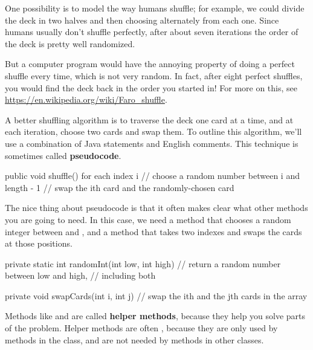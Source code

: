One possibility is to model the way humans shuffle; for example, we could divide the deck in two halves and then choosing alternately from each one.
Since humans usually don't shuffle perfectly, after about seven iterations the order of the deck is pretty well randomized.

But a computer program would have the annoying property of doing a perfect shuffle every time, which is not very random.
In fact, after eight perfect shuffles, you would find the deck back in the order you started in!
For more on this, see \url{https://en.wikipedia.org/wiki/Faro_shuffle}.


A better shuffling algorithm is to traverse the deck one card at a time, and at each iteration, choose two cards and swap them.
To outline this algorithm, we'll use a combination of Java statements and English comments.
This technique is sometimes called {\bf pseudocode}.


\begin{code}
public void shuffle() {
    for each index i {
        // choose a random number between i and length - 1
        // swap the ith card and the randomly-chosen card
    }
}
\end{code}


The nice thing about pseudocode is that it often makes clear what other methods you are going to need.
In this case, we need a method that chooses a random integer between  and , and a method that takes two indexes and swaps the cards at those positions.

\begin{code}
private static int randomInt(int low, int high) {
    // return a random number between low and high, 
    // including both
}

private void swapCards(int i, int j) {
    // swap the ith and the jth cards in the array
}
\end{code}


Methods like  and  are called {\bf helper methods}, because they help you solve parts of the problem.
Helper methods are often , because they are only used by methods in the class, and are not needed by methods in other classes.


